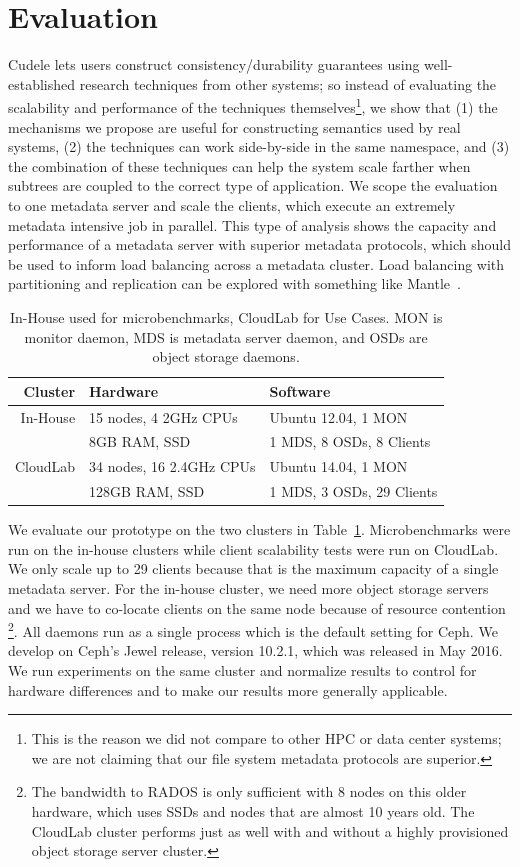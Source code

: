 \section{Evaluation}
\label{sec:evaluation}

Cudele lets users construct consistency/durability guarantees using
well-established research techniques from other systems; so instead of
evaluating the scalability and performance of the techniques
themselves\footnote{ This is the reason we did not compare to other HPC or data
center systems; we are not claiming that our file system metadata protocols are
superior.}, we show that (1) the mechanisms we propose are useful for
constructing semantics used by real systems, (2) the techniques can work
side-by-side in the same namespace, and (3) the combination of these techniques
can help the system scale farther when subtrees are coupled to the correct type
of application.  We scope the evaluation to one metadata server and scale the
clients, which execute an extremely metadata intensive job in parallel. This
type of analysis shows the capacity and performance of a metadata server with
superior metadata protocols, which should be used to inform load balancing
across a metadata cluster. Load balancing with partitioning and replication can
be explored with something like Mantle~\cite{sevilla:sc15-mantle}.

\begin{table}
\begin{tabular}{ r | l | l}
  Cluster  & Hardware               & Software \\\hline
  In-House & 15 nodes, 4 2GHz CPUs  & Ubuntu 12.04, 1 MON\\
           & 8GB RAM, SSD           & 1 MDS, 8 OSDs, 8 Clients\\
  CloudLab & 34 nodes, 16 2.4GHz CPUs & Ubuntu 14.04, 1 MON\\
           & 128GB RAM, SSD         & 1 MDS, 3 OSDs, 29 Clients
\end{tabular}
\caption{In-House used for microbenchmarks, CloudLab for Use Cases. MON is
monitor daemon, MDS is metadata server daemon, and OSDs are object storage
daemons.\label{table:clusters}} 
\end{table}

We evaluate our prototype on the two clusters in Table~\ref{table:clusters}.
Microbenchmarks were run on the in-house clusters while client scalability
tests were run on CloudLab. We only scale up to 29 clients because that is the
maximum capacity of a single metadata server. For the in-house cluster, we need
more object storage servers and we have to co-locate clients on the same node
because of resource contention \footnote{The bandwidth to RADOS is only
sufficient with 8 nodes on this older hardware, which uses SSDs and nodes that
are almost 10 years old.  The CloudLab cluster performs just as well with and
without a highly provisioned object storage server cluster.}. All daemons run
as a single process which is the default setting for Ceph. We develop on Ceph's
Jewel release, version 10.2.1, which was released in May 2016.  We run
experiments on the same cluster and normalize results to control for hardware
differences and to make our results more generally applicable.  

